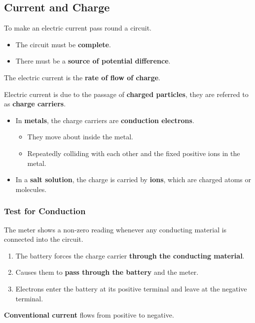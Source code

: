 \subsection{Current and Charge}

To make an electric current pass round a circuit.
\begin{itemize}
    \item The circuit must be \textbf{complete}.
    \item There must be a \textbf{source of potential difference}.
\end{itemize}

The electric current is the \textbf{rate of flow of charge}.

Electric current is due to the passage of \textbf{charged particles}, they are referred to as \textbf{charge carriers}.
\begin{itemize}
    \item In \textbf{metals}, the charge carriers are \textbf{conduction electrons}.
        \begin{itemize}
            \item They move about inside the metal.
            \item Repeatedly colliding with each other and the fixed positive ions in the metal.
        \end{itemize}
    \item In a \textbf{salt solution}, the charge is carried by \textbf{ions}, which are charged atoms or molecules.
\end{itemize}

\subsubsection*{Test for Conduction}

The meter shows a non-zero reading whenever any conducting material is connected into the circuit.
\begin{enumerate}
    \item The battery forces the charge carrier \textbf{through the conducting material}.
    \item Causes them to \textbf{pass through the battery} and the meter.
    \item Electrons enter the battery at its positive terminal and leave at the negative terminal.
\end{enumerate}

\textbf{Conventional current} flows from positive to negative.

